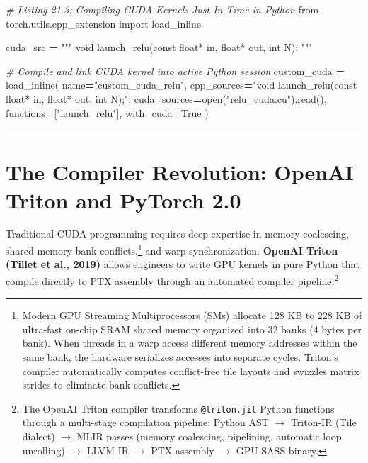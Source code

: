 \documentclass[
  letterpaper,
]{scrbook}
\newenvironment{Shaded}{\begin{snugshade}}{\end{snugshade}}
\newcommand{\BuiltInTok}[1]{#1}
\newcommand{\CommentTok}[1]{\textcolor[rgb]{0.56,0.35,0.01}{\textit{#1}}}
\newcommand{\ImportTok}[1]{#1}
\newcommand{\NormalTok}[1]{#1}
\newcommand{\OperatorTok}[1]{\textcolor[rgb]{0.81,0.36,0.00}{\textbf{#1}}}
\newcommand{\StringTok}[1]{\textcolor[rgb]{0.31,0.60,0.02}{#1}}
\newcommand{\VariableTok}[1]{\textcolor[rgb]{0.00,0.00,0.00}{#1}}
\begin{document}
\begin{Shaded}
\begin{Highlighting}[]
\CommentTok{\# Listing 21.3: Compiling CUDA Kernels Just{-}In{-}Time in Python}
\ImportTok{from}\NormalTok{ torch.utils.cpp\_extension }\ImportTok{import}\NormalTok{ load\_inline}

\NormalTok{cuda\_src }\OperatorTok{=} \StringTok{"""}
\StringTok{void launch\_relu(const float* in, float* out, int N);}
\StringTok{"""}

\CommentTok{\# Compile and link CUDA kernel into active Python session}
\NormalTok{custom\_cuda }\OperatorTok{=}\NormalTok{ load\_inline(}
\NormalTok{    name}\OperatorTok{=}\StringTok{"custom\_cuda\_relu"}\NormalTok{,}
\NormalTok{    cpp\_sources}\OperatorTok{=}\StringTok{"void launch\_relu(const float* in, float* out, int N);"}\NormalTok{,}
\NormalTok{    cuda\_sources}\OperatorTok{=}\BuiltInTok{open}\NormalTok{(}\StringTok{"relu\_cuda.cu"}\NormalTok{).read(),}
\NormalTok{    functions}\OperatorTok{=}\NormalTok{[}\StringTok{"launch\_relu"}\NormalTok{],}
\NormalTok{    with\_cuda}\OperatorTok{=}\VariableTok{True}
\NormalTok{)}
\end{Highlighting}
\end{Shaded}

\begin{center}\rule{0.5\linewidth}{0.5pt}\end{center}

\section{The Compiler Revolution: OpenAI Triton and PyTorch
2.0}\label{the-compiler-revolution-openai-triton-and-pytorch-2.0}

Traditional CUDA programming requires deep expertise in memory
coalescing, shared memory bank conflicts,\footnote{Modern GPU Streaming
  Multiprocessors (SMs) allocate 128 KB to 228 KB of ultra-fast on-chip
  SRAM shared memory organized into 32 banks (4 bytes per bank). When
  threads in a warp access different memory addresses within the same
  bank, the hardware serializes accesses into separate cycles. Triton's
  compiler automatically computes conflict-free tile layouts and
  swizzles matrix strides to eliminate bank conflicts.} and warp
synchronization. \textbf{OpenAI Triton (Tillet et al., 2019)} allows
engineers to write GPU kernels in pure Python that compile directly to
PTX assembly through an automated compiler pipeline:\footnote{The OpenAI
  Triton compiler transforms \texttt{@triton.jit} Python functions
  through a multi-stage compilation pipeline: Python AST \(\to\)
  Triton-IR (Tile dialect) \(\to\) MLIR passes (memory coalescing,
  pipelining, automatic loop unrolling) \(\to\) LLVM-IR \(\to\) PTX
  assembly \(\to\) GPU SASS binary.}
\end{document}
